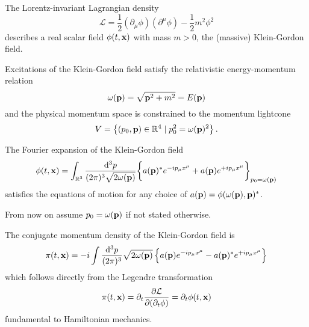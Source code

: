 \begin{definition}
	The Lorentz-invariant Lagrangian density
	\begin{equation}
		\mathcal{L}
		=
		\frac{1}{2}
		\left(\partial_\mu\phi\right)
		\left(\partial^\mu\phi\right)
		-
		\frac{1}{2}
		m^2\phi^2
		\label{eq:kg_lagrangian}
	\end{equation}
	describes a real scalar field $\phi(t,\vb{x})$ with mass $m>0$, the (massive) Klein-Gordon field.
\end{definition}
\begin{theorem}\label{th:relativistic_energy_momentum}
	Excitations of the Klein-Gordon field satisfy the relativistic energy-momentum relation
	\begin{equation}
		\omega(\vb{p})
		=
		\sqrt{\vb{p}^2+m^2}
		=
		E(\vb{p})
		\label{eq:energy_momentum_relation}
	\end{equation}
	and the physical momentum space is constrained to the momentum lightcone
	\begin{equation}
		V
		=
		\left\{
			(p_0,\vb{p})\in\mathbb{R}^4
			\mid
			p_0^2=\omega(\vb{p})^2
		\right\}
		\label{eq:momentum_lightcone}
		.
	\end{equation}
\end{theorem}
\begin{theorem}\label{thm:kg_fourier_expansion}
	The Fourier expansion of the Klein-Gordon field
	\begin{equation}
		\phi(t,\vb{x})
		=
		\int_{\mathbb{R}^3}\frac{\dd[3]{p}}{(2\pi)^3\sqrt{2\omega(\vb{p})}}
		\biggl\{
			a(\vb{p})^*
			e^{-ip_\mu x^\mu}
			+
			a(\vb{p})
			e^{+ip_\mu x^\mu}
		\biggr\}_{p_0=\omega(\vb{p})}
	\end{equation}
	satisfies the equations of motion for any choice of $a(\vb{p})=\phi(\omega(\vb{p}),\vb{p})^*$.
\end{theorem}
From now on assume $p_0=\omega(\vb{p})$ if not stated otherwise.
\begin{corollary}
	The conjugate momentum density of the Klein-Gordon field is
	\begin{equation}
		\pi(t,\vb{x})
		=
		-i
		\int\frac{\dd[3]{p}}{(2\pi)^3}
		\sqrt{2\omega(\vb{p})}
		\left\{
			a(\vb{p})
			e^{-ip_\mu x^\mu}
			-
			a(\vb{p})^*
			e^{+ip_\mu x^\mu}
		\right\}
	\end{equation}
	which follows directly from the Legendre transformation
	\begin{equation}
		\pi(t,\vb{x})
		=
		\partial_t\pdv{\mathcal{L}}{(\partial_t\phi)}
		=
		\partial_t\phi(t,\vb{x})
	\end{equation}
	fundamental to Hamiltonian mechanics.
\end{corollary}
